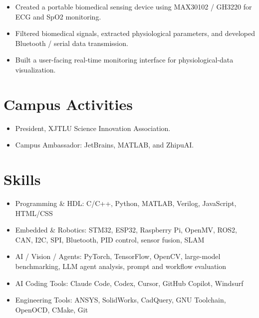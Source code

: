 \documentclass[9pt,letterpaper]{article}
\newcommand{\entry}[1]{\vspace{1.6pt}{\bfseries #1}\vspace{0.3pt}}
\begin{document}
\entry{Wearable ECG \& Oxygen Saturation (SpO2) Monitoring Device | Shanghai Key Lab of Multi-Dimensional Information Processing | Nov 2023 - Feb 2024}
\begin{itemize}
\item Created a portable biomedical sensing device using MAX30102 / GH3220 for ECG and SpO2 monitoring.
\item Filtered biomedical signals, extracted physiological parameters, and developed Bluetooth / serial data transmission.
\item Built a user-facing real-time monitoring interface for physiological-data visualization.
\end{itemize}
\section*{Campus Activities}
\begin{itemize}
\item President, XJTLU Science Innovation Association.
\item Campus Ambassador: JetBrains, MATLAB, and ZhipuAI.
\end{itemize}
\section*{Skills}
\begin{itemize}
\item Programming \& HDL: C/C++, Python, MATLAB, Verilog, JavaScript, HTML/CSS
\item Embedded \& Robotics: STM32, ESP32, Raspberry Pi, OpenMV, ROS2, CAN, I2C, SPI, Bluetooth, PID control, sensor fusion, SLAM
\item AI / Vision / Agents: PyTorch, TensorFlow, OpenCV, large-model benchmarking, LLM agent analysis, prompt and workflow evaluation
\item AI Coding Tools: Claude Code, Codex, Cursor, GitHub Copilot, Windsurf
\item Engineering Tools: ANSYS, SolidWorks, CadQuery, GNU Toolchain, OpenOCD, CMake, Git
\end{itemize}
\end{document}

